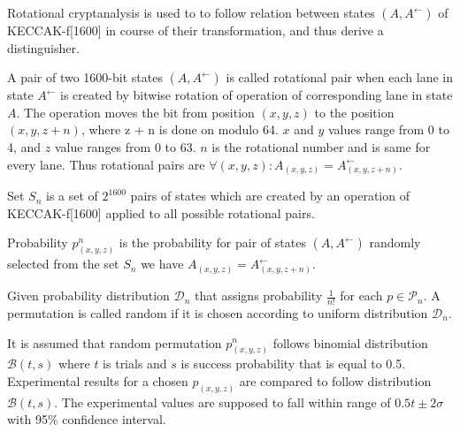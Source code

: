 
Rotational cryptanalysis\cite{00041} is used to to follow relation between states $(A, A^{\leftarrow})$ of 
KECCAK-f[1600] in course of their transformation, and thus derive a distinguisher.

\begin{defn}
A pair of two 1600-bit states $(A, A^{\leftarrow})$ is called rotational pair when each lane in state $A^{\leftarrow}$
is created by bitwise rotation of operation of corresponding lane in state $A$. The operation moves the bit from 
position $(x, y, z)$ to the position $(x, y, z + n)$, where z + n is done on modulo 64. $x$ and $y$ values range from 0 
to 4, and $z$ value ranges from 0 to 63. $n$ is the rotational number and is same for every lane. Thus rotational pairs
are $\forall(x, y, z) : A_{(x, y, z)} = A^{\leftarrow}_{(x, y, z + n)}$. \cite{00022}
\end{defn}

\begin{defn}
Set $S_n$ is a set of $2^{1600}$ pairs of states which are created by an operation of KECCAK-f[1600] applied to all
possible rotational pairs. \cite{00022}
\end{defn}

\begin{defn}
Probability $p^{n}_{(x, y, z)}$ is the probability for pair of states $(A, A^{\leftarrow})$ randomly selected from the
set $S_n$ we have $A_{(x, y, z)} = A^{\leftarrow}_{(x, y, z + n)}$. \cite{00022}
\end{defn}

\begin{defn}
Given probability distribution $\mathcal{D}_n$ that assigns probability $\frac{1}{n!}$ for each $p \in \mathcal{P}_n$.
A permutation is called random if it is chosen according to uniform distribution $\mathcal{D}_n$.\cite{00022}
\end{defn}

It is assumed that random permutation $p^n_{(x, y, z)}$ follows binomial distribution $\mathcal{B}(t, s)$ where $t$ is
trials and $s$ is success probability that is equal to 0.5. Experimental results for a chosen $p_{(x, y, z)}$ are 
compared to follow distribution $\mathcal{B}(t, s)$. The experimental values are supposed to fall within range of 
$0.5t\pm2\sigma$ with 95\% confidence interval.

